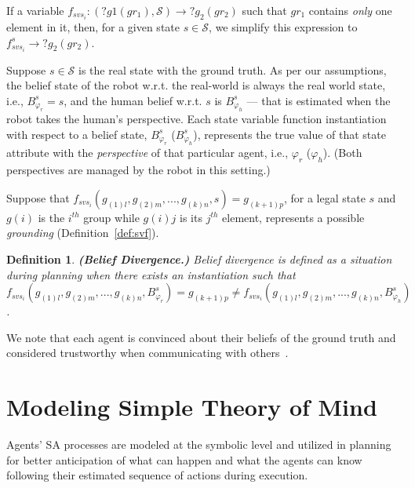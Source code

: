 \documentclass[letterpaper]{article} %
\newtheorem{definition}{Definition}
\begin{document}
If a variable $f_{svs_i}: (?g1 (gr_1), \mathcal{S}) \rightarrow ?g_2 (gr_2)$ such that $gr_1$ contains \textit{only} one element in it, then, for a given state $s \in \mathcal{S}$, we simplify this expression to $f_{svs_i}^{s} \rightarrow ?g_2 (gr_2)$. 

Suppose $s \in \mathcal{S}$ is the real state with the ground truth. As per our assumptions, the belief state of the robot w.r.t. the real-world is always the real world state, i.e., $B_{\varphi_r}^s = s$, and the human belief w.r.t. $s$ is $B_{\varphi_h}^s$ --- that is estimated when the robot takes the human's perspective. Each state variable function instantiation with respect to a belief state, $B_{\varphi_r}^s$ ($B_{\varphi_h}^s$), represents the true value of that state attribute with the \textit{perspective} of that particular agent, i.e., $\varphi_r$ ($\varphi_h$). (Both perspectives are managed by the robot in this setting.) 

Suppose that 
$f_{\textit{svs}_i}(g_{(1)l},g_{(2)m},...,g_{(k)n},s) = g_{(k+1)p}$, for a legal state $s$ and $g(i)$ is the $i^{th}$ group while $g(i)j$ is its $j^{th}$ element, represents a possible {\em grounding} (Definition~\ref{def:svf}).

\begin{definition} \label{def:bd}
\textbf{(Belief Divergence.)}
Belief divergence is defined as a situation during planning when there exists an instantiation such that 
$f_{\textit{svs}_i}(g_{(1)l},g_{(2)m},...,g_{(k)n},B_{\varphi_r}^s) = {g_{(k+1)p}}  \neq f_{\textit{svs}_i}(g_{(1)l},g_{(2)m},...,g_{(k)n},B_{\varphi_h}^s)$.
\end{definition} 

We note that each agent is convinced about their beliefs of the ground truth and considered trustworthy when communicating with others~\cite{fabiano2021multi}.

\section{Modeling Simple Theory of Mind}
Agents' SA processes are modeled at the symbolic level and utilized in planning for better anticipation of what can happen and what the agents can know following their estimated sequence of actions during execution. 
\end{document}
